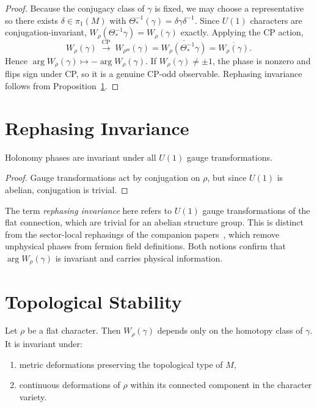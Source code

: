 \documentclass[epjc3]{svjour3}
\begin{document}
\begin{proof}
Because the conjugacy class of $\gamma$ is fixed, we may choose a representative
so there exists $\delta\in\pi_1(M)$ with $\Theta_*^{-1}(\gamma)=\delta\gamma\delta^{-1}$.
Since $U(1)$ characters are conjugation-invariant,
$W_\rho(\Theta_*^{-1}\gamma) = W_\rho(\gamma)$ exactly.
Applying the CP action,
\[
W_\rho(\gamma) \;\xrightarrow{\text{CP}}\; W_{\rho^\Theta}(\gamma)
= \overline{W_\rho(\Theta_*^{-1}\gamma)} = \overline{W_\rho(\gamma)}.
\]
Hence $\arg W_\rho(\gamma) \mapsto -\arg W_\rho(\gamma)$.
If $W_\rho(\gamma) \neq \pm 1$, the phase is nonzero and flips sign under CP,
so it is a genuine CP-odd observable.  Rephasing invariance follows from
Proposition~\ref{prop:rephasing}.
\end{proof}

\section{Rephasing Invariance}
\label{prop:rephasing}

\begin{proposition}
Holonomy phases are invariant under all $U(1)$ gauge transformations.
\end{proposition}

\begin{proof}
Gauge transformations act by conjugation on $\rho$,
but since $U(1)$ is abelian, conjugation is trivial.
\end{proof}

\begin{remark}
The term \emph{rephasing invariance} here refers to $U(1)$ gauge
transformations of the flat connection, which are trivial for an abelian
structure group.  This is distinct from the sector-local rephasings
of the companion papers~\cite{Gentry:CKM,Gentry:PMNS}, which remove
unphysical phases from fermion field definitions.  Both notions confirm
that $\arg W_\rho(\gamma)$ is invariant and carries physical information.
\end{remark}

\section{Topological Stability}

\begin{theorem}
Let $\rho$ be a flat character.
Then $W_\rho(\gamma)$ depends only on the homotopy class of $\gamma$.
It is invariant under:
\begin{enumerate}
\item metric deformations preserving the topological type of $M$,
\item continuous deformations of $\rho$ within its connected component
in the character variety.
\end{enumerate}
\end{theorem}
\end{document}
